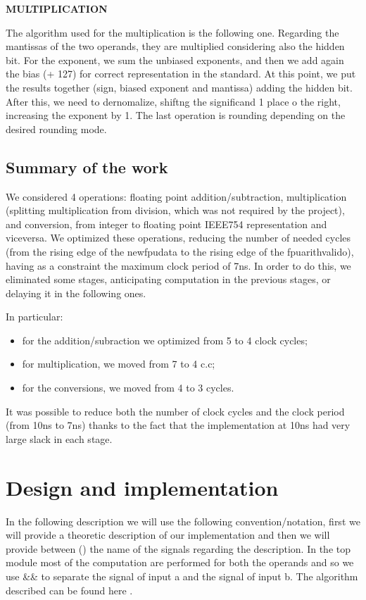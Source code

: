 \textbf{MULTIPLICATION}
\newline

The algorithm used for the multiplication is the following one. Regarding the mantissas of the two operands, they are multiplied considering also the hidden bit. For the exponent, we sum the unbiased exponents, and then we add again the bias (+ 127) for correct representation in the standard. At this point, we put the results together (sign, biased exponent and mantissa) adding the hidden bit.
After this, we need to dernomalize, shiftng the significand 1 place o the right, increasing the exponent by 1. The last operation is rounding depending on the desired rounding mode.
\newline


\subsection{Summary of the work}
We considered 4 operations: floating point addition/subtraction, multiplication (splitting multiplication from division, which was not required by the project), and conversion, from integer to floating point IEEE754 representation and viceversa. We optimized these operations, reducing the number of needed cycles (from the rising edge of the new\textunderscore fpu\textunderscore data to the rising edge of the fpu\textunderscore arith\textunderscore valid\textunderscore o), having as a constraint the maximum clock period of 7ns. In order to do this, we eliminated some stages, anticipating computation in the previous stages, or delaying it in the following ones.

In particular:
\begin{itemize}
 \item for the addition/subraction we optimized from 5 to 4 clock cycles;
 \item for multiplication, we moved from 7 to 4 c.c;
 \item for the conversions, we moved from 4 to 3 cycles.
\end{itemize} 
It was possible to reduce both the number of clock cycles and the clock period (from 10ns to 7ns)  thanks to the fact that the implementation at 10ns had very large slack in each stage.


\pagebreak

\section{Design and implementation}
In the following description we will use the following convention/notation, first we will provide a theoretic description of our implementation and then we will provide between () the name of the signals regarding the description. In the top module most of the computation are performed for both the operands and so we use \&\& to separate the signal of input a and the signal of input b.
The algorithm described can be found here \cite{mor1kxRep}.
\newline

